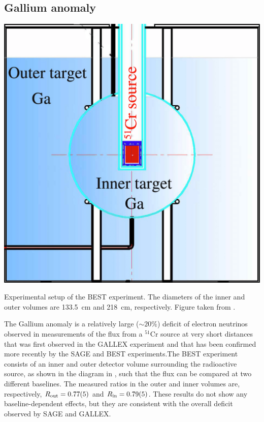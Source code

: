 \subsection{Gallium anomaly}
\begin{marginfigure}
    \centering
    \includegraphics{figures/theory/BESTscheme_cropped_small.png}
    \caption{Experimental setup of the BEST experiment. The diameters of the inner and outer volumes are \SI{133.5}{cm} and \SI{218}{cm}, respectively. Figure taken from \cite{Barinov_2022}.\label{fig:best-experiment}}
\end{marginfigure}
The Gallium anomaly is a relatively large ($\sim20\%$) deficit of electron neutrinos observed in measurements of the flux from a $^{51}\mathrm{Cr}$ source at very short distances that was first observed in the GALLEX experiment\cite{gallex:1998} and that has been confirmed more recently by the SAGE and BEST experiments\cite{Barinov_2022,Abdurashitov_2006}.The BEST experiment consists of an inner and outer detector volume surrounding the radioactive source, as shown in the diagram in , such that the flux can be compared at two different baselines.
The measured ratios in the outer and inner volumes are, respectively, $R_\mathrm{out} = \num{0.77+-0.05}$ and $R_\mathrm{in} = \num{0.79+-0.05}$.
These results do not show any baseline-dependent effects, but they are consistent with the overall deficit observed by SAGE and GALLEX.

